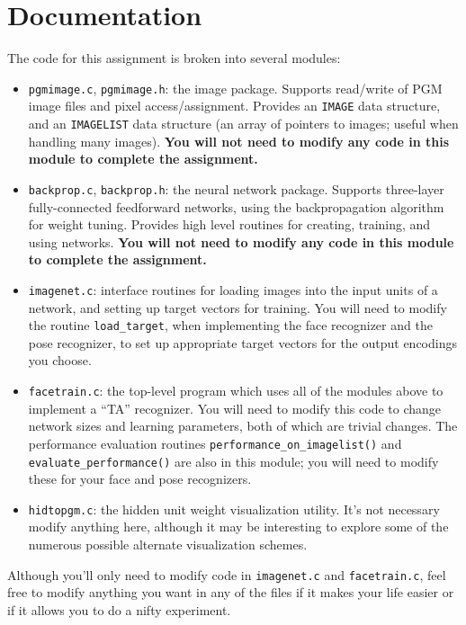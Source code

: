 \section{Documentation}
\label{docs}

The code for this assignment is broken into several modules:

\begin{itemize}
\item {\tt pgmimage.c}, {\tt pgmimage.h}: the image package.  Supports
read/write of PGM image files and pixel access/assignment.  Provides
an {\tt IMAGE} data structure, and an {\tt IMAGELIST} data structure
(an array of pointers to images; useful when handling many images). 
{\bf You will not need to modify any code in this module to complete
the assignment.}

\item {\tt backprop.c}, {\tt backprop.h}: the neural network package.
Supports three-layer fully-connected feedforward networks, using the
backpropagation algorithm for weight tuning.  Provides high level
routines for creating, training, and using networks.  {\bf You will not
need to modify any code in this module to complete the assignment.}

\item {\tt imagenet.c}: interface routines for loading images into
the input units of a network, and setting up target vectors for training.
You will need to modify the routine {\tt load\_target}, when
implementing the face recognizer and the pose recognizer, to set
up appropriate target vectors for the output encodings you choose.

\item {\tt facetrain.c}: the top-level program which uses all of the
modules above to implement a ``TA'' recognizer.  You will need to
modify this code to change network sizes and learning parameters,
both of which are trivial changes.  The performance evaluation routines
{\tt performance\_on\_imagelist()} and {\tt evaluate\_performance()} are
also in this module; you will need to modify these for your face
and pose recognizers.

\item {\tt hidtopgm.c}: the hidden unit weight visualization utility.
It's not necessary modify anything here, although it may be interesting
to explore some of the numerous possible alternate visualization schemes.
\end{itemize}

Although you'll only need to modify code in {\tt imagenet.c} and
{\tt facetrain.c}, feel free to modify anything you want in any of
the files if it makes your life easier or if it allows you to do
a nifty experiment.

